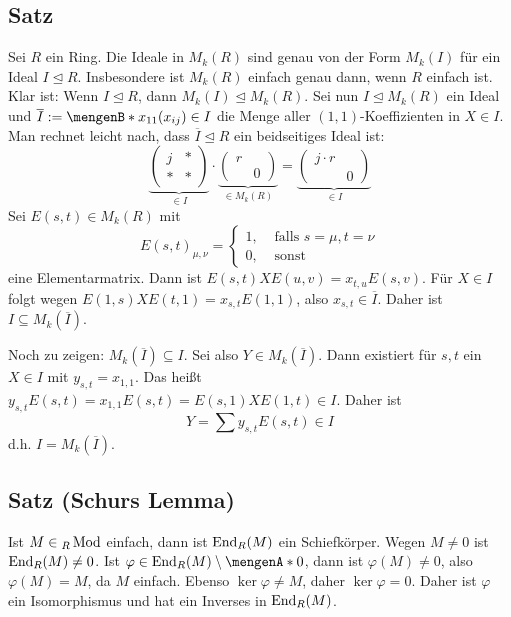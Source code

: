 \subsection[Satz über die Ideale eines Ringes $R$ und die Ideale in $M_k(R)$]{Satz} %
\label{sub:225}
Sei $R$ ein Ring. Die Ideale in $M_k(R)$ sind genau von der Form $M_k(I)$ für ein Ideal $I \unlhd R$. Insbesondere ist $M_k(R)$ einfach genau dann, wenn $R$ einfach ist.
Klar ist: Wenn $I \unlhd R$, dann $M_k(I) \unlhd M_k(R)$. Sei nun $I \unlhd M_k(R)$ ein Ideal und $\overline{I} := \set[x_{11}]{(x_{ij}) \in I}$ die Menge aller 
$(1,1)$-Koeffizienten in $X \in I$. Man rechnet leicht nach, dass $\overline{I} \unlhd R $ ein beidseitiges Ideal ist:
\[
	\underbrace{\begin{pmatrix}
		j & * \\
		* & *
	\end{pmatrix}}_{\in I} \cdot \underbrace{\begin{pmatrix}
		r & \\
		 & 0
	\end{pmatrix}}_{\in M_k(R)} = \underbrace{\begin{pmatrix}
		j \cdot r & \\
		& 0
	\end{pmatrix}}_{\in I}
\]
Sei $E(s,t) \in M_k(R)$ mit 
\[
	E(s,t)_{\mu, \nu} = \begin{cases}
		1, &\text{ falls }s= \mu, t= \nu \\
		0, &\text{ sonst }
	\end{cases}
\]
eine Elementarmatrix. Dann ist $E(s,t) X E(u,v) = x_{t,u} E(s,v)$. Für $X \in I$ folgt wegen $E(1,s) X E(t,1) = x_{s,t} E(1,1)$, also $x_{s,t} \in \overline{I}$. Daher ist
$I \subseteq M_k(\overline{I})$.

Noch zu zeigen: $M_k(\overline{I}) \subseteq I$. Sei also $Y \in M_k(\overline{I})$. Dann existiert für $s,t$ ein $X \in I$ mit $y_{s,t} = x_{1,1}$. Das heißt 
$y_{s,t} E(s,t) = x_{1,1} E(s,t) = E(s,1) X E(1,t) \in I$. Daher ist 
\[
	Y = \sum y_{s,t} E(s,t) \in I
\]
d.h. $I= M_k(\overline{I} )$. \bewende \smallskip\\

\subsection{Satz (Schurs Lemma)} %
\label{sub:226}
Ist $M \in {_R \operatorname{Mod}}$ einfach, dann ist $\operatorname{End}_R(M)$ ein Schiefkörper.
Wegen $M \not= 0$ ist $\operatorname{End}_R(M) \not= 0$. Ist $\varphi \in \End_R(M) \setminus \set{0}$, dann ist $\varphi(M) \not= 0$, also $\varphi(M)=M$, da $M$ einfach. Ebenso
$\ker \varphi \not= M$, daher $\ker \varphi = 0$. Daher ist $\varphi$ ein Isomorphismus und hat ein Inverses in $\operatorname{End}_R(M)$. \bewende 

